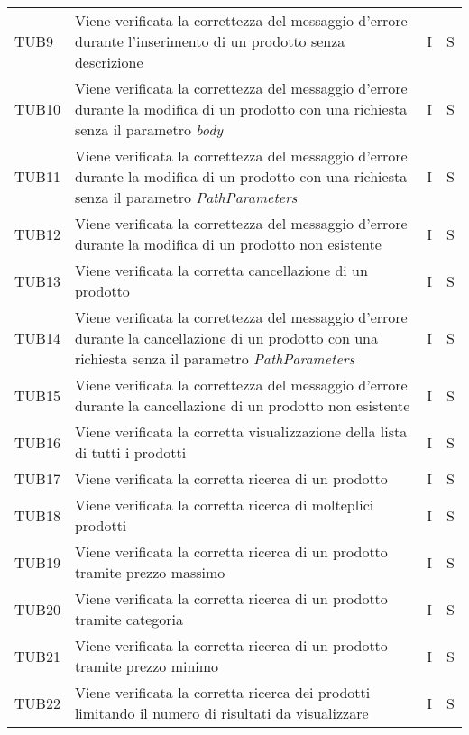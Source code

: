 {\begin{longtable}{C{2cm} C{9.6cm} C{1.5cm} C{1cm}}
TUB9 & Viene verificata la correttezza del messaggio d'errore durante l'inserimento di un prodotto senza descrizione & I & S\\

TUB10 & Viene verificata la correttezza del messaggio d'errore durante la modifica di un prodotto con una richiesta senza il parametro \textit{body} & I & S\\


TUB11 & Viene verificata la correttezza del messaggio d'errore durante la modifica di un prodotto con una richiesta senza il parametro \textit{PathParameters} & I & S\\

TUB12 & Viene verificata la correttezza del messaggio d'errore durante la modifica di un prodotto non esistente & I & S\\

TUB13 & Viene verificata la corretta cancellazione di un prodotto & I & S\\

TUB14 & Viene verificata la correttezza del messaggio d'errore durante la cancellazione di un prodotto con una richiesta senza il parametro \textit{PathParameters} & I & S\\

TUB15 & Viene verificata la correttezza del messaggio d'errore durante la cancellazione di un prodotto non esistente & I & S\\

TUB16 & Viene verificata la corretta visualizzazione della lista di tutti i prodotti & I & S\\

TUB17 & Viene verificata la corretta ricerca di un prodotto & I & S\\

TUB18 & Viene verificata la corretta ricerca di molteplici prodotti & I & S\\

TUB19 & Viene verificata la corretta ricerca di un prodotto tramite prezzo massimo & I & S\\

TUB20 & Viene verificata la corretta ricerca di un prodotto tramite categoria & I & S\\

TUB21 & Viene verificata la corretta ricerca di un prodotto tramite prezzo minimo & I & S\\

TUB22 & Viene verificata la corretta ricerca dei prodotti limitando il numero di risultati da visualizzare & I & S\\


\end{longtable}}
